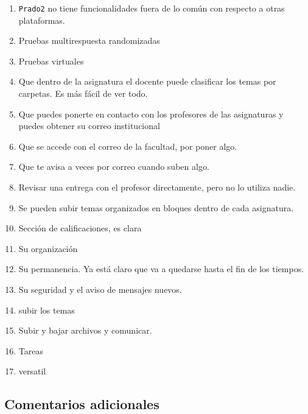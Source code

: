 \begin{enumerate}
\item \texttt{Prado2} no tiene funcionalidades fuera de lo común con respecto a otras plataformas.
\item Pruebas multirespuesta randomizadas
\item Pruebas virtuales
\item Que dentro de la asignatura el docente puede clasificar los temas por carpetas. Es más fácil de ver todo.
\item Que puedes ponerte en contacto con los profesores de las asignaturas y puedes obtener su correo institucional
\item Que se accede con el correo de la facultad, por poner algo.
\item Que te avisa a veces por correo cuando suben algo.
\item Revisar una entrega con el profesor directamente, pero no lo utiliza nadie.
\item Se pueden subir temas organizados en bloques dentro de cada asignatura.
\item Sección de calificaciones, es clara
\item Su organización
\item Su permanencia. Ya está claro que va a quedarse hasta el fin de los tiempos.
\item Su seguridad y el aviso de mensajes nuevos.
\item subir los temas
\item Subir y bajar archivos y comunicar.
\item Tareas
\item versatil
\end{enumerate}

\subsection{Comentarios adicionales}

